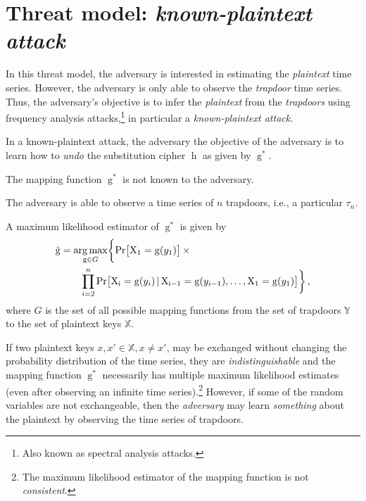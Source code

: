 \documentclass[ ../main.tex]{subfiles}
\begin{document}
\section{Threat model: \emph{known-plaintext attack}}
\label{sec:threatmodel}
In this threat model, the adversary is interested in estimating the \emph{plaintext} time series. However, the adversary is only able to observe the \emph{trapdoor} time series. Thus, the adversary's objective is to infer the \emph{plaintext} from the \emph{trapdoors} using frequency analysis attacks,\footnote{Also known as spectral analysis attacks\cite{ref9}.} in particular a \emph{known-plaintext attack}.

In a known-plaintext attack, the adversary the objective of the adversary is to learn how to \emph{undo} the substitution cipher $\operatorname{h}$ as given by $\operatorname{g}^*$.
\begin{assumption}
The mapping function $\operatorname{g}^*$ is not known to the adversary.
\end{assumption}
\begin{assumption}
The adversary is able to observe a time series of $n$ trapdoors, i.e., a particular $\tau_n$.
\end{assumption}
A maximum likelihood estimator of $\operatorname{g}^*$ is given by
\begin{align}
\label{eq:mle}
\begin{split}
    \operatorname{\hat{g}} &= \operatorname*{arg\,max}_{\operatorname{g} \in G}
    \biggl\{
        \Pr\!\left[
            \mathrm{X_1} = \operatorname{g}(y_1)\right] \times\\
        & \qquad \prod_{i=2}^{n} \Pr\!\left[
            \mathrm{X_i} = \operatorname{g}(y_i) {\,|\,}
            \mathrm{X_{i-1}} = \operatorname{g}(y_{i-1}),
            \ldots,
            \mathrm{X_1} = \operatorname{g}(y_1)
        \right]
    \biggr\}\,,
\end{split}
\end{align}
where $G$ is the set of all possible mapping functions from the set of trapdoors $\mathbb{Y}$ to the set of plaintext keys $\mathbb{X}$.

If two plaintext keys $x,x' \in \mathbb{X}, x \neq x'$, may be exchanged without changing the probability distribution of the time series, they are \emph{indistinguishable} and the mapping function $\operatorname{g}^*$ necessarily has multiple maximum likelihood estimates (even after observing an infinite time series).\footnote{The maximum likelihood estimator of the mapping function is not \emph{consistent}.} However, if some of the random variables are not exchangeable, then the \emph{adversary} may learn \emph{something} about the plaintext by observing the time series of trapdoors.
\end{document}
